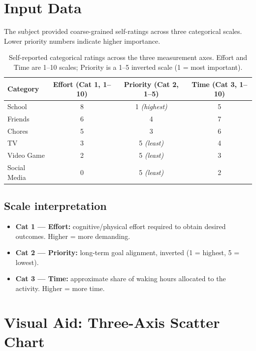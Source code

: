 \documentclass[11pt,a4paper]{article}
\begin{document}
\section{Input Data}
\label{sec:data}

The subject provided coarse-grained self-ratings across three categorical scales. Lower priority numbers indicate higher importance.

\begin{table}[h]
\centering
\renewcommand{\arraystretch}{1.25}
\begin{tabular}{lccc}
\toprule
\textbf{Category} & \textbf{Effort (Cat 1, 1--10)} & \textbf{Priority (Cat 2, 1--5)} & \textbf{Time (Cat 3, 1--10)} \\
\midrule
School        & 8 & 1 \emph{(highest)} & 5 \\
Friends       & 6 & 4                  & 7 \\
Chores        & 5 & 3                  & 6 \\
TV            & 3 & 5 \emph{(least)}   & 4 \\
Video Game    & 2 & 5 \emph{(least)}   & 3 \\
Social Media  & 0 & 5 \emph{(least)}   & 2 \\
\bottomrule
\end{tabular}
\caption{Self-reported categorical ratings across the three measurement axes. Effort and Time are 1--10 scales; Priority is a 1--5 inverted scale (1 = most important).}
\label{tab:data}
\end{table}

\subsection{Scale interpretation}
\begin{itemize}[leftmargin=1.4em,itemsep=2pt]
  \item \textbf{Cat 1 --- Effort:} cognitive/physical effort required to obtain desired outcomes. Higher = more demanding.
  \item \textbf{Cat 2 --- Priority:} long-term goal alignment, inverted (1 = highest, 5 = lowest).
  \item \textbf{Cat 3 --- Time:} approximate share of waking hours allocated to the activity. Higher = more time.
\end{itemize}

\section{Visual Aid: Three-Axis Scatter Chart}
\label{sec:chart}
\end{document}
